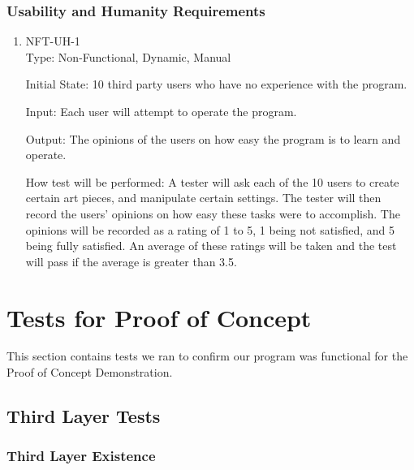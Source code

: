 \documentclass[12pt, titlepage]{article}
\begin{document}
\subsubsection{Usability and Humanity Requirements}

\begin{enumerate}

\item{NFT-UH-1}\\
Type: Non-Functional, Dynamic, Manual

Initial State: 10 third party users who have no experience with the program.

Input: Each user will attempt to operate the program.

Output: The opinions of the users on how easy the program is to learn and operate.

How test will be performed: A tester will ask each of the 10 users to create certain art pieces, and manipulate certain settings. The tester will then record the users' opinions on how easy these tasks were to accomplish. The opinions will be recorded as a rating of 1 to 5, 1 being not satisfied, and 5 being fully satisfied. An average of these ratings will be taken and the test will pass if the average is greater than 3.5.

\end{enumerate}

\section{Tests for Proof of Concept}

This section contains tests we ran to confirm our program was functional for the Proof of Concept Demonstration.

\subsection{Third Layer Tests}

\subsubsection{Third Layer Existence}
\end{document}
